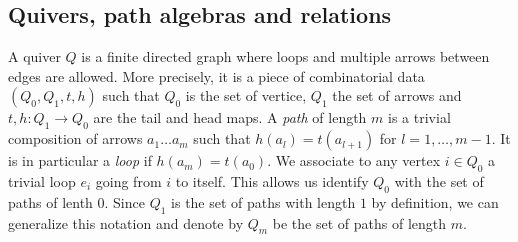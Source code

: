     \subsection{Quivers, path algebras and relations}

        A quiver $Q$ is a finite directed graph where loops and multiple arrows between edges are allowed. More precisely, it is a piece of combinatorial data $(Q_0,Q_1,t,h)$ such that $Q_0$ is the set of vertice, $Q_1$ the set of arrows and $t,h:Q_1\to Q_0$ are the tail and head maps. A \emph{path} of length $m$ is a trivial composition of arrows $a_1\dots a_m$ such that $h(a_l)=t(a_{l+1})$ for $l=1,\dots,m-1$. It is in particular a \emph{loop} if $h(a_m)=t(a_0)$. We associate to any vertex $i\in Q_0$ a trivial loop $e_i$ going from $i$ to itself. This allows us identify $Q_0$ with the set of paths of lenth $0$. Since $Q_1$ is the set of paths with length $1$ by definition, we can generalize this notation and denote by $Q_m$ be the set of paths of length $m$.
        
